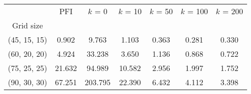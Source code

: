 \begin{tabular}{ccccccc}
\toprule
{} &     PFI &  $k$ = 0 &  $k$ = 10 &  $k$ = 50 &  $k$ = 100 &  $k$ = 200 \\
Grid size    &         &          &           &           &            &            \\
\midrule
(45, 15, 15) &   0.902 &    9.763 &     1.103 &     0.363 &      0.281 &      0.330 \\
(60, 20, 20) &   4.924 &   33.238 &     3.650 &     1.136 &      0.868 &      0.722 \\
(75, 25, 25) &  21.632 &   94.989 &    10.582 &     2.956 &      1.997 &      1.752 \\
(90, 30, 30) &  67.251 &  203.795 &    22.390 &     6.432 &      4.112 &      3.398 \\
\bottomrule
\end{tabular}
